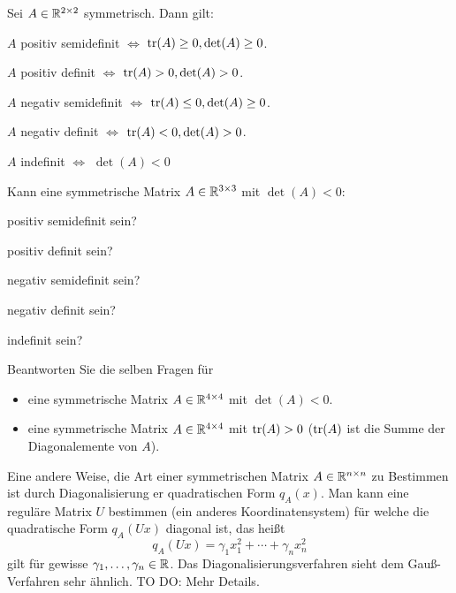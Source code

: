 \begin{thm}
		Sei $A \in \mathbb{R}^{2 \times 2}$ symmetrisch. Dann gilt:
	\begin{enuma} 
		\item $A$ positiv semidefinit $\Leftrightarrow$ $\operatorname{tr}(A) \ge 0, \det(A) \ge 0$. 
		\item $A$ positiv definit $\Leftrightarrow$ $\operatorname{tr}(A) > 0, \det(A) > 0$. 
		\item $A$ negativ semidefinit $\Leftrightarrow$ $\operatorname{tr}(A) \le 0, \det(A) \ge 0$. 
		\item $A$ negativ definit $\Leftrightarrow$ $\operatorname{tr}(A) < 0, \det(A) > 0$. 
		\item $A$ indefinit $\Leftrightarrow$ $\det(A) < 0$
	\end{enuma} 
\end{thm} 

\begin{aufg}
	Kann eine symmetrische Matrix $A \in \mathbb{R}^{3 \times 3}$ mit $\det(A) < 0$:
	\begin{enuma} 
		\item positiv semidefinit sein? 
		\item positiv definit sein? 
		\item negativ semidefinit sein? 
		\item negativ definit sein? 
		\item indefinit sein? 
	\end{enuma} 
	Beantworten Sie die selben Fragen für 
	\begin{itemize}
		\item eine symmetrische Matrix $A \in \mathbb{R}^{4 \times 4}$ mit $\det(A) < 0$. 
		\item eine symmetrische Matrix $A \in \mathbb{R}^{4 \times 4}$ mit $\operatorname{tr}(A) >0$ ($\operatorname{tr}(A)$ ist die Summe der Diagonalemente von $A$). 
	\end{itemize} 
\end{aufg} 


\begin{bem}
	Eine andere Weise, die Art einer symmetrischen Matrix $A \in \mathbb{R}^{n \times n}$ zu Bestimmen ist durch Diagonalisierung er quadratischen Form $q_A(x)$. Man kann eine reguläre Matrix $U$ bestimmen (ein anderes Koordinatensystem) für welche die quadratische Form $q_A(U x)$ diagonal ist, das heißt 
	\[
		q_A(U x) = \gamma_1 x_1^2 +  \cdots + \gamma_n x_n^2
	\] 
	gilt für gewisse $\gamma_1,\ldots,\gamma_n \in \mathbb{R}$. Das Diagonalisierungsverfahren sieht dem Gauß-Verfahren sehr ähnlich. TO DO: Mehr Details. 
\end{bem} 


